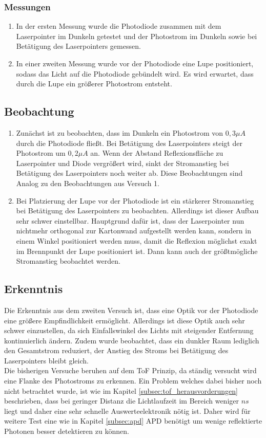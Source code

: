 \subsubsection{Messungen}
\begin{enumerate}
	\item In der ersten Messung wurde die Photodiode zusammen mit dem Laserpointer im Dunkeln getestet und der Photostrom im Dunkeln sowie bei Betätigung des Laserpointers gemessen.
	\item In einer zweiten Messung wurde vor der Photodiode eine Lupe positioniert, sodass das Licht auf die Photodiode gebündelt wird. Es wird erwartet, dass durch die Lupe ein größerer Photostrom entsteht.
\end{enumerate}
\subsection{Beobachtung}
\begin{enumerate}
	\item Zunächst ist zu beobachten, dass im Dunkeln ein Photostrom von $0,3\mu A$ durch die Photodiode fließt. Bei Betätigung des Laserpointers steigt der Photostrom um $0,2\mu A$ an. Wenn der Abstand Reflexionsfläche zu Laserpointer und Diode vergrößert wird, sinkt der Stromanstieg bei Betätigung des Laserpointers noch weiter ab. Diese Beobachtungen sind Analog zu den Beobachtungen aus Versuch 1.
	\item Bei Platzierung der Lupe vor der Photodiode ist ein stärkerer Stromanstieg bei Betätigung des Laserpointers zu beobachten. Allerdings ist dieser Aufbau sehr schwer einstellbar. Hauptgrund dafür ist, dass der Laserpointer nun nichtmehr orthogonal zur Kartonwand aufgestellt werden kann, sondern in einem Winkel positioniert werden muss, damit die Reflexion möglichst exakt im Brennpunkt der Lupe positioniert ist. Dann kann auch der größtmögliche Stromanstieg beobachtet werden. 
\end{enumerate}
\subsection{Erkenntnis}
Die Erkenntnis aus dem zweiten Versuch ist, dass eine Optik vor der Photodiode eine größere Empfindlichkeit ermöglicht. Allerdings ist diese Optik auch sehr schwer einzustellen, da sich Einfallswinkel des Lichts mit steigender Entfernung kontinuierlich ändern. Zudem wurde beobachtet, dass ein dunkler Raum lediglich den Gesamtstrom reduziert, der Anstieg des Stroms bei Betätigung des Laserpointers bleibt gleich.\\
Die bisherigen Versuche beruhen auf dem \ac{ToF} Prinzip, da ständig versucht wird eine Flanke des Photostroms zu erkennen. Ein Problem welches dabei bisher noch nicht betrachtet wurde, ist wie im Kapitel \ref{subsec:tof_herausvorderungen} beschrieben, dass bei geringer Distanz die Lichtlaufzeit im Bereich weniger $ns$ liegt und daher eine sehr schnelle Auswerteelektronik nötig ist. Daher wird für weitere Test eine wie in Kapitel \ref{subsec:apd} \ac{APD} benötigt um wenige reflektierte Photonen besser detektieren zu können.
